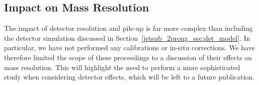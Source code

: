 \documentclass[11pt]{cernrep}
\begin{document}
% 

\subsection{Impact on Mass Resolution}\label{jetsub_2prong_sec:detector_robust}

The impact of detector resolution and pile-up is far more complex than
including the detector simulation discussed in
Section~\ref{jetsub_2prong_sec:det_model}.
%
In particular, we have not performed any calibrations or in-situ
corrections.
%
We have therefore limited the scope of these proceedings to a
discussion of their effects on mass resolution.
% 
%
This will highlight the need to perform a more sophisticated study
when considering detector effects, which will be left to a future
publication.
\end{document}
